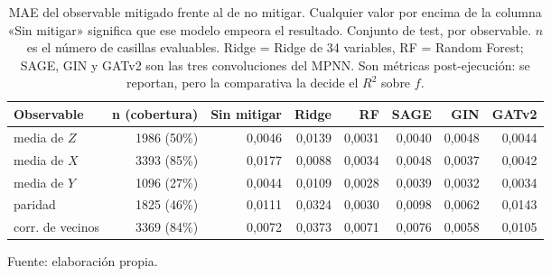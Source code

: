 \begin{table}[htbp]
    \centering
    {\footnotesize
    \begin{tabular}{@{}lrrrrrrr@{}}
        \toprule
        \textbf{Observable} & \textbf{n (cobertura)} & \textbf{Sin mitigar} & \textbf{Ridge} & \textbf{RF} & \textbf{SAGE} & \textbf{GIN} & \textbf{GATv2} \\
        \midrule
        media de $Z$ & 1986 (50\%) & 0,0046 & 0,0139 & 0,0031 & 0,0040 & 0,0048 & 0,0044 \\
        media de $X$ & 3393 (85\%) & 0,0177 & 0,0088 & 0,0034 & 0,0048 & 0,0037 & 0,0042 \\
        media de $Y$ & 1096 (27\%) & 0,0044 & 0,0109 & 0,0028 & 0,0039 & 0,0032 & 0,0034 \\
        paridad & 1825 (46\%) & 0,0111 & 0,0324 & 0,0030 & 0,0098 & 0,0062 & 0,0143 \\
        corr. de vecinos & 3369 (84\%) & 0,0072 & 0,0373 & 0,0071 & 0,0076 & 0,0058 & 0,0105 \\
        \bottomrule
    \end{tabular}}

    \caption{MAE del observable mitigado frente al de no mitigar. Cualquier valor por encima de la columna «Sin mitigar» significa que ese modelo empeora el resultado. Conjunto de test, por observable. $n$ es el número de casillas evaluables. Ridge = Ridge de 34 variables, RF = Random Forest; SAGE, GIN y GATv2 son las tres convoluciones del MPNN.  Son métricas post-ejecución: se reportan, pero la comparativa la decide el $R^2$ sobre $f$.}
    \label{tab:mitigacion_mae}

    {\footnotesize Fuente: elaboración propia.}
\end{table}

